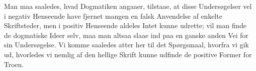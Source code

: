\documentclass[12pt]{book}
\newcommand{\opage}[1]{\marginnote{\footnotesize\textit{[#1]}}}
\begin{document}
Man maa saaledes, hvad Dogmatiken angaaer, tilstaae, at disse Undersøgelser
vel i negativ Henseende have fjernet mangen en falsk
\opage{110} Anvendelse af enkelte Skriftsteder, men i positiv Henseende aldeles Intet kunne
udrette; vil man finde de dogmatiske Ideer selv, maa man altsaa slaae ind paa
en ganske anden Vei for sin Undersøgelse. Vi komme saaledes atter her til det
Spørgsmaal, hvorfra vi gik ud, hvorledes vi nemlig af den hellige Skrift kunne
udfinde de positive Former for Troen.
\end{document}

